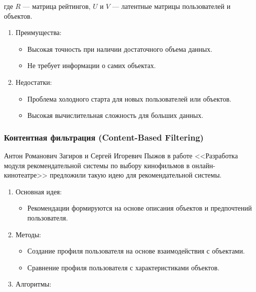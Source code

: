 \begin{enumerate}
где \(R \) --- матрица рейтингов, \( U \) и \( V \) --- латентные матрицы
пользователей и объектов.

\begin{enumerate}
\def\labelenumi{\arabic{enumi}.}
\setcounter{enumi}{3}
\tightlist
\item
  Преимущества:

  \begin{itemize}
  \tightlist
  \item
    Высокая точность при наличии достаточного объема данных.
  \item
    Не требует информации о самих объектах.
  \end{itemize}
\item
  Недостатки:

  \begin{itemize}
  \tightlist
  \item
    Проблема холодного старта для новых пользователей или объектов.
  \item
    Высокая вычислительная сложность для больших данных.
  \end{itemize}
\end{enumerate}

\hypertarget{ux43aux43eux43dux442ux435ux43dux442ux43dux430ux44f-ux444ux438ux43bux44cux442ux440ux430ux446ux438ux44f-content-based-filtering}{%
\subsubsection*{Контентная фильтрация (Content-Based
Filtering)}\label{ux43aux43eux43dux442ux435ux43dux442ux43dux430ux44f-ux444ux438ux43bux44cux442ux440ux430ux446ux438ux44f-content-based-filtering}}
Антон Романович Загиров и Сергей Игоревич Пыжов в работе <<Разработка модуля рекомендательной системы по выбору кинофильмов в онлайн-кинотеатре>> предложили такую идею для рекомендательной системы\cite{загиров2018разработка}.
\begin{enumerate}
\def\labelenumi{\arabic{enumi}.}
\tightlist
\item
  Основная идея:

  \begin{itemize}
  \tightlist
  \item
    Рекомендации формируются на основе описания объектов и предпочтений
    пользователя.
  \end{itemize}
\item
  Методы:

  \begin{itemize}
  \tightlist
  \item
    Создание профиля пользователя на основе взаимодействия с объектами.
  \item
    Сравнение профиля пользователя с характеристиками объектов.
  \end{itemize}
\item
  Алгоритмы:


\end{enumerate}
\end{enumerate}
